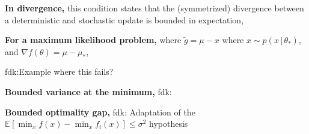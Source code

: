 \documentclass[twoside]{article}
\newcommand{\fdk}[1]{\textcolor{Periwinkle}{fdk:#1}}
\newcommand*{\expect}[2][]{\ensuremath{\mathbb{E}_{#1} \left[ #2 \right] }} %
\newcommand{\cond}{\,\vert\,}
\begin{document}
{\bf In divergence,} this condition states that the (symmetrized) divergence between 
a deterministic and stochastic update is bounded in expectation,
\aligns{
	&
	\mathbb{E}_{\tilde g_t}\bigg[
	\cB_{A^*}\paren{\mu - \eta g, \mu - \eta \nabla f(\theta)}
	\\
	&\hphantom{\mathbb{E}_{\tilde g}[}
	+ \cB_{A^*}\paren{\mu - \eta \nabla f(\theta), \mu - \eta g}
	\bigg]
	\leq 
	\eta C.
}

{\bf For a maximum likelihood problem, }
where $\tilde g = \mu - x$ 
where $x \sim p(x\cond\theta_*)$,
and $\nabla f(\theta) = \mu - \mu_*$,
\aligns{
	&
	\mathbb{E}_{x}\bigg[
	\cB_{A^*}\paren{(1-\eta) \mu + \eta x, (1-\eta)\mu + \eta \mu_*}
	\\
	&\hphantom{\mathbb{E}_{\tilde g_t}[}
	\cB_{A^*}\paren{(1-\eta)\mu + \eta \mu_*, (1-\eta) \mu + \eta x}
	\bigg]
	\leq 
	\eta C.
}

\fdk{Example where this fails?}

\textbf{Bounded variance at the minimum, }
\fdk{\citep{dragomir2021fast}}

\textbf{Bounded optimality gap,}
\fdk{
Adaptation of the $\expect{\min_x f(x) - \min_x f_i(x)} \leq \sigma^2$ hypothesis \citep{dorazio2021stochastic}}












\clearpage
\end{document}
